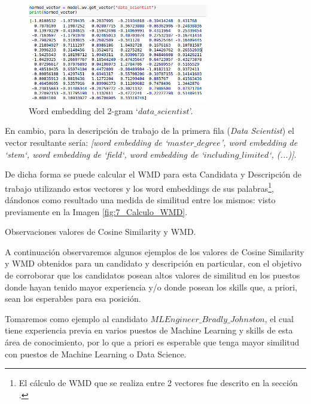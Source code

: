 \documentclass[12pt,a4paper]{article}
\makeatletter
\renewcommand\paragraph{\@startsection{paragraph}{4}{\z@}
            {-2.5ex\@plus -1ex \@minus -.25ex}
            {1.25ex \@plus .25ex}
            {\normalfont\normalsize\bfseries}}
\makeatother
\begin{document}
\begin{sloppypar}
\begin{figure}[H] 
 \centering
 \includegraphics[width=0.7\textwidth]{images/implementacion_5/8_Word_emb.png}
\captionsetup{justification=centering,margin=3cm}
 \caption{Word embedding del 2-gram ‘$data\_scientist$’.} 
 \label{fig:8_Word_emb}
\end{figure}

En cambio, para la descripción de trabajo de la primera fila (\textit{Data Scientist}) el vector resultante sería: \textit{[word embedding de ‘$master\_degree$', word embedding de ‘stem‘, word embedding de ‘field‘, word embedding de ‘$including\_limited$‘, (...)]}. 

De dicha forma se puede calcular el WMD para esta Candidata y Descripción de trabajo utilizando estos vectores y los word embeddings de sus palabras\footnote{El cálculo de WMD que se realiza entre 2 vectores fue descrito en la sección \textit{}.}, dándonos como resultado una medida de similitud entre los mismos: visto previamente en la Imagen \ref{fig:7_Calculo_WMD}.

\cleardoublepage

\paragraph{Observaciones valores de Cosine Similarity y WMD.}\label{Obs_cos_y_wmd}

A continuación observaremos algunos ejemplos de los valores de Cosine Similarity y WMD obtenidos para un candidato y descripción en particular, con el objetivo de corroborar que los candidatos posean altos valores de similitud en los puestos donde hayan tenido mayor experiencia y/o donde posean los skills que, a priori, sean los esperables para esa posición.

Tomaremos como ejemplo al candidato \textit{$MLEngineer\_Bradly\_Johnston$}, el cual tiene experiencia previa en varios puestos de Machine Learning y skills de esta área de conocimiento, por lo que a priori es esperable que tenga mayor similitud con puestos de Machine Learning o Data Science. 


\end{sloppypar}
\end{document}
